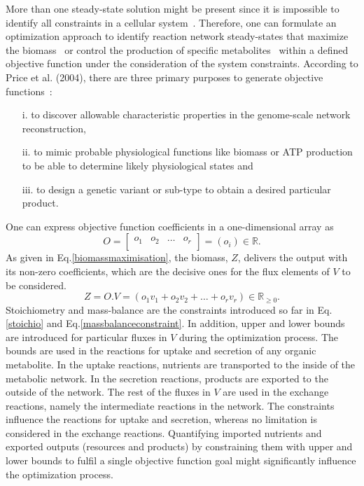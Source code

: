 More than one steady-state solution might be present since it is impossible to identify all constraints in a cellular system~\cite{KAUFFMAN2003491}. Therefore, one can formulate an optimization approach to identify reaction network steady-states that maximize the biomass~\cite{KAUFFMAN2003491,PRICE2004} or control the production of specific metabolites~\cite{VARMA1993} within a defined objective function under the consideration of the system constraints. According to Price et al. (2004),
there are three primary purposes to generate objective functions~\cite{PRICE2004}:
\begin{itemize}
	\item[i.] to discover allowable characteristic properties in the genome-scale network reconstruction,
	\item[ii.] to mimic probable physiological functions like biomass or ATP production to be able to determine likely physiological states and
	\item[iii.] to design a genetic variant or sub-type to obtain a desired particular product.
\end{itemize}

One can express objective function coefficients in a one-dimensional array as
\begin{equation} \tag{4}
	O =  \begin{bmatrix}
		o_{1} & o_{2} & \dots  & o_{r}\\
	\end{bmatrix}=(o_{i})\in \mathbb{R}.
	\label{objectivecoefficients}
\end{equation}
As given in Eq.\eqref{biomassmaximisation}, the biomass, $Z$, delivers the output with its non-zero coefficients, which are the decisive ones for the flux elements of $V$ to be considered.
\begin{equation} \tag{5}
	Z = O.V = (o_{1}v_{1} + o_{2}v_{2} + \dots + o_{r}v_{r})\in \mathbb{R}_{\ge0}.
	\label{biomassmaximisation}
\end{equation}
Stoichiometry and mass-balance are the constraints introduced so far in Eq.\eqref{stoichio} and Eq.\eqref{massbalanceconstraint}. In addition, upper and lower bounds are introduced for particular fluxes in $V$ during the optimization process. The bounds are used in the reactions for uptake and secretion of any organic metabolite. In the uptake reactions, nutrients are transported to the inside of the metabolic network. In the secretion reactions, products are exported to the outside of the network. The rest of the fluxes in $V$ are used in the exchange reactions, namely the intermediate reactions in the network. The constraints influence the reactions for uptake and secretion, whereas no limitation is considered in the exchange reactions. Quantifying imported nutrients and exported outputs (resources and products) by constraining them with upper and lower bounds to fulfil a single objective function goal might significantly influence the optimization process.

